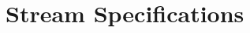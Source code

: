 \documentclass[10pt]{beamer}
\begin{document}
\begin{comment}
  \vspace*{-2ex}
  Hence: $\joerg \infred 
                     \strcns{\datf{0}}{\strcns{\datf{1}}{\strcns{\datf{0}}\strcns{\datf{0}}{
                                           \sstrev^{\omega}}}}$.

\end{frame}%
\end{comment}     


\section{Stream Specifications}
\end{document}
